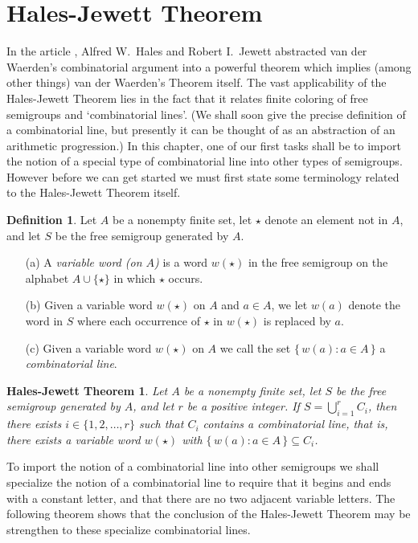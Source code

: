 \documentclass[12pt,showtrims]{memoir}
\theoremstyle{plain}
\newtheorem{hj}[thm]{Hales-Jewett Theorem}
\theoremstyle{definition}
\newtheorem{defn}[thm]{Definition}
\begin{document}
\addtolength{\baselineskip}{1.7pt}
\section{Hales-Jewett Theorem}
In the article \cite{Hales:1963fk}, Alfred W.~Hales and Robert I.~Jewett abstracted van der Waerden's combinatorial argument into a powerful theorem which implies (among other things) van der Waerden's Theorem itself. 
The vast applicability of the Hales-Jewett Theorem lies in the fact that it relates finite coloring of free semigroups and `combinatorial lines'. 
(We shall soon give the precise definition of a combinatorial line, but presently it can be thought of as an abstraction of an arithmetic progression.)
In this chapter, one of our first tasks shall be to import the notion of a special type of combinatorial line into other types of semigroups. 
However before we can get started we must first state some terminology related to the Hales-Jewett Theorem itself.

\begin{defn}
  Let $A$ be a nonempty finite set, let $\star$ denote an element not in $A$, and let $S$ be the free semigroup generated by $A$.
  \begin{itemize}
    \item[(a)] 
      A \emph{variable word (on $A$)} is a word $w(\star)$ in the free semigroup on the alphabet $A \cup \{\star\}$ in which $\star$ occurs.

    \item[(b)] 
      Given a variable word $w(\star)$ on $A$ and $a \in A$, we let $w(a)$ denote the word in $S$ where each occurrence of $\star$ in $w(\star)$ is replaced by $a$.

    \item[(c)] 
      Given a variable word $w(\star)$ on $A$ we call the set $\{\, w(a) : a \in A \,\}$ a \emph{combinatorial line}.
  \end{itemize}
\end{defn}

\begin{hj}
  Let $A$ be a nonempty finite set, let $S$ be the free semigroup generated by $A$, and let $r$ be a positive integer.
  If $S = \bigcup_{i=1}^r C_i$, then there exists $i \in \{1, 2, \ldots, r\}$ such that $C_i$ contains a combinatorial line, that is, there exists a variable word $w(\star)$ with $\bigl\{\, w(a) : a \in A \,\bigr\} \subseteq C_i$.
\end{hj}

To import the notion of a combinatorial line into other semigroups we shall specialize the notion of a combinatorial line to require that it begins and ends with a constant letter, and that there are no two adjacent variable letters.
The following theorem shows that the conclusion of the Hales-Jewett Theorem may be strengthen to these specialize combinatorial lines.  
\end{document}
